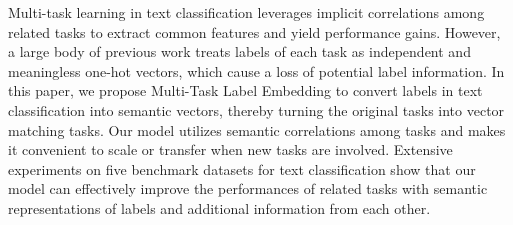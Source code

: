 Multi-task learning in text classification leverages implicit correlations among related tasks to extract common features and yield performance gains. However, a large body of previous work treats labels of each task as independent and meaningless one-hot vectors, which cause a loss of potential label information. In this paper, we propose Multi-Task Label Embedding to convert labels in text classification into semantic vectors, thereby turning the original tasks into vector matching tasks. Our model utilizes semantic correlations among tasks and makes it convenient to scale or transfer when new tasks are involved. Extensive experiments on five benchmark datasets for text classification show that our model can effectively improve the performances of related tasks with semantic representations of labels and additional information from each other.
